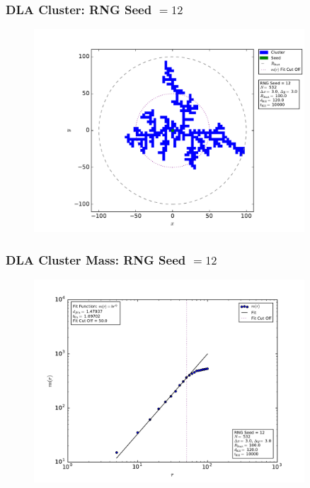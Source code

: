 \documentclass[mathserif,18pt,xcolor=table]{beamer}
\begin{document}
\begin{frame}
  \frametitle{DLA Cluster: RNG Seed $= 12$}
\begin{figure}
  \centering
  \includegraphics[width=0.9\textwidth]{problem_3/large_cluster_seed_num_12.pdf}
\end{figure}
\end{frame}

\begin{frame}
  \frametitle{DLA Cluster Mass: RNG Seed $= 12$}
\begin{figure}
  \centering
  \includegraphics[width=0.9\textwidth]{problem_3/large_cluster_mass_seed_num_12.pdf}
\end{figure}
\end{frame}
\end{document}
